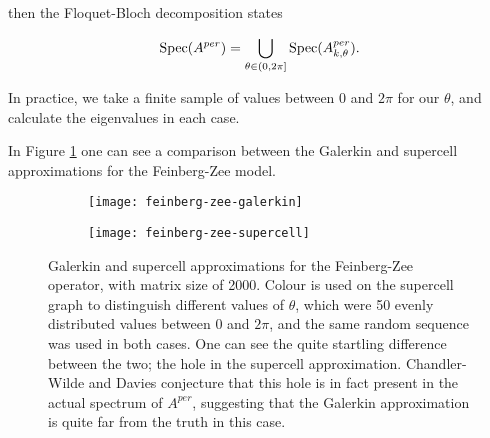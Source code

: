 \documentclass[../main.tex]{subfiles}
\begin{document}
then the Floquet-Bloch decomposition states 

$$\mathrm{Spec}(A^{per}) = \bigcup_{\theta \in (0, 2 \pi]} \mathrm{Spec}(A^{per}_{k, \theta}).$$

In practice, we take a finite sample of values between 0 and $2 \pi$ for our $\theta$, and calculate the eigenvalues in each case. 

In Figure \ref{fig:feinberg-zee} one can see a comparison between the Galerkin and supercell approximations for the Feinberg-Zee model. 

\begin{figure}[p!]
\centering
\begin{subfigure}{0.4\textwidth}
\texttt{[image: feinberg-zee-galerkin]}
\end{subfigure}
\begin{subfigure}{0.4\textwidth}
\texttt{[image: feinberg-zee-supercell]}
\end{subfigure}
\caption{Galerkin and supercell approximations for the Feinberg-Zee operator, with matrix size of 2000. Colour is used on the supercell graph to distinguish different values of $\theta$, which were 50 evenly distributed values between $0$ and $2 \pi$, and the same random sequence was used in both cases. One can see the quite startling difference between the two; the hole in the supercell approximation. Chandler-Wilde and Davies \cite{chandler-wilde2012spectrum} conjecture that this hole is in fact present in the actual spectrum of $A^{per}$, suggesting that the Galerkin approximation is quite far from the truth in this case.}\label{fig:feinberg-zee}
\end{figure}
\clearpage
\end{document}
